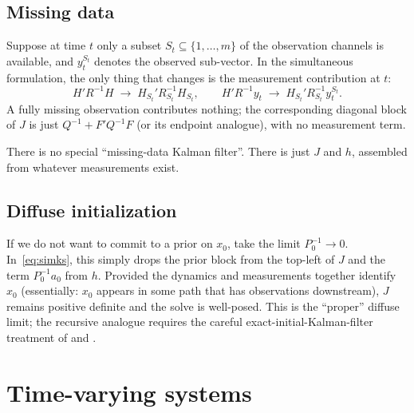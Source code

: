 \documentclass[11pt]{article}
\begin{document}
\subsection{Missing data}
\label{sec:missing}

Suppose at time $t$ only a subset $S_t\subseteq\{1,\ldots,m\}$ of the
observation channels is available, and $y_{t}^{S_t}$ denotes the
observed sub-vector.  In the simultaneous formulation, the only thing
that changes is the measurement contribution at $t$:
\begin{equation}
H'R^{-1}H \;\longrightarrow\; H_{S_t}'R_{S_t}^{-1}H_{S_t},
\qquad
H'R^{-1}y_t \;\longrightarrow\; H_{S_t}'R_{S_t}^{-1}y_t^{S_t}.
\end{equation}
A fully missing observation contributes nothing; the corresponding
diagonal block of $J$ is just $Q^{-1}+F'Q^{-1}F$ (or its endpoint
analogue), with no measurement term.

There is no special ``missing-data Kalman filter''.  There is just $J$
and $h$, assembled from whatever measurements exist.

\subsection{Diffuse initialization}
\label{sec:diffuse}

If we do not want to commit to a prior on $x_0$, take the limit
$P_0^{-1}\to 0$.  In~\eqref{eq:simks}, this simply drops the prior block
from the top-left of $J$ and the term $P_0^{-1}a_0$ from $h$.  Provided
the dynamics and measurements together identify $x_0$ (essentially: $x_0$
appears in some path that has observations downstream), $J$ remains
positive definite and the solve is well-posed.  This is the
``proper'' diffuse limit; the recursive analogue requires the careful
exact-initial-Kalman-filter treatment of \citet{deJong1989} and
\citet{KoopmanDurbin2003}.

\section{Time-varying systems}
\label{sec:tv}
\end{document}
